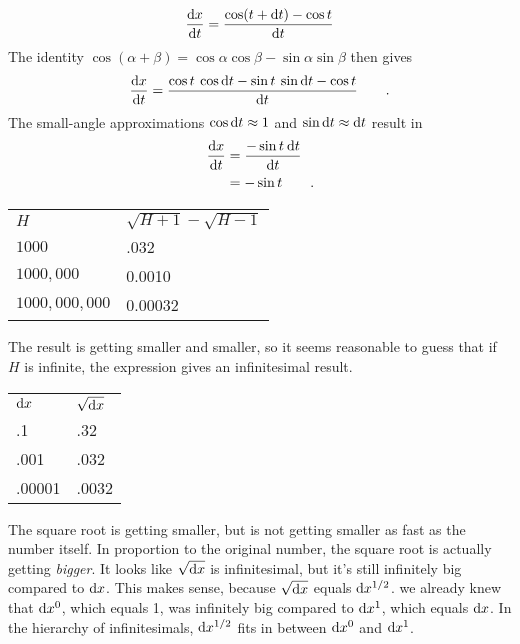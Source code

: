
\begin{equation*}
  \frac{\textup{d} x}{\textup{d} t} = \frac{\cos(t+\textup{d} t)-\cos t}{\textup{d} t}
\end{equation*}
The identity $\cos(\alpha+\beta)=\cos\alpha\cos\beta-\sin\alpha\sin\beta$ then gives
\begin{equation*}
  \frac{\textup{d} x}{\textup{d} t} = \frac{\cos t \: \cos \textup{d} t - \sin t \: \sin \textup{d} t - \cos t}{\textup{d} t} \qquad .\\
\end{equation*}
The small-angle approximations  $\cos \textup{d} t\approx 1$ and $\sin \textup{d} t\approx \textup{d} t$
result in
\begin{align*}
\frac{\textup{d} x}{\textup{d} t}   &= \frac{-\sin t \: \textup{d} t}{\textup{d} t} \\
                        &= -\sin t \qquad .
\end{align*}


\begin{tabular}{ll}
$H$ & $\sqrt{H+1}-\sqrt{H-1}$ \\
$1000$ & .032 \\
$1000,000$ & 0.0010 \\
$1000,000,000$ & 0.00032 
\end{tabular}

The result is getting smaller and smaller, so it seems reasonable to guess that if $H$ is infinite,
the expression gives an infinitesimal result.


\begin{tabular}{ll}
$\textup{d} x$ & $\sqrt{\textup{d} x}$ \\
.1 & .32 \\
.001 & .032 \\
.00001 & .0032
\end{tabular}

The square root is getting smaller, but is not getting smaller as fast as the number itself.
In proportion to the original number, the square root is actually getting \emph{bigger}. It
looks like $\sqrt{\textup{d} x}$ is infinitesimal, but it's still infinitely big compared to
$\textup{d} x$. This makes sense, because $\sqrt{\textup{d} x}$ equals $\textup{d} x^{1/2}$.
we already knew that $\textup{d} x^0$, which equals 1, was
infinitely big compared to $\textup{d} x^1$, which equals $\textup{d} x$.
In the hierarchy of infinitesimals, $\textup{d} x^{1/2}$ fits in between $\textup{d} x^0$
and  $\textup{d} x^1$.

